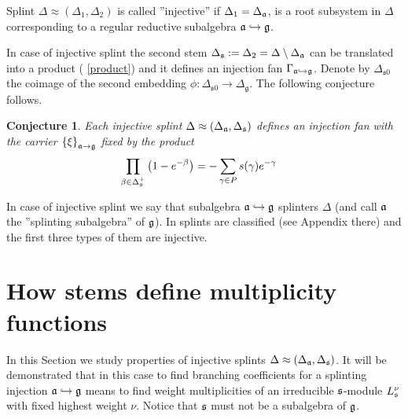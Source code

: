 \documentclass[12pt]{article}
\newtheorem{Cnj}[Def]{Conjecture}
\begin{document}
Splint $\Delta \approx (\Delta _{1},\Delta _{2})$ is called ''injective'' if
$\Delta _{1}=\Delta _{\frak{a}}$, is a root subsystem
in $\Delta $ corresponding to a regular reductive subalgebra $\frak{a}%
\hookrightarrow \frak{g}$.

In case of injective splint the second stem $\Delta _{\frak{s}}:=\Delta
_{2}=\Delta \setminus \Delta _{\frak{a}}$ can be translated into a product (%
\ref{product}) and it defines an injection fan $\Gamma _{\frak{a}%
\hookrightarrow \frak{g}}$. Denote by $\Delta_{\mathfrak{s}0}$ the coimage of the second embedding $\phi:\Delta_{\mathfrak{s}0}\to \Delta_{\mathfrak{g}}$.
The following conjecture follows.

\begin{Cnj}
Each injective splint $\Delta \approx (\Delta _{\frak{a}},\Delta _{\frak{s}})
$ defines an injection fan with the carrier $\left\{ \xi \right\} _{\frak{a}%
\rightarrow \frak{g}}$ fixed by the product
\begin{equation}
\prod_{\beta \in \Delta _{\frak{s}}^{+}}\left( 1-e^{-\beta }\right)
=-\sum_{\gamma \in P}s(\gamma )e^{-\gamma }\quad   \label{splint product}
\end{equation}
\end{Cnj}

In case of injective splint we say that subalgebra $\frak{a}\hookrightarrow \frak{g}$
splinters $\Delta $ (and call $\frak{a}$ the ''splinting subalgebra'' of $%
\frak{g}$). In \cite{richter2008splints} splints are classified (see Appendix there)
and the first three types of them are injective.

\section{How stems define multiplicity functions}

\label{sec:stems and multiplicity functions}

In this Section we study properties of injective splints  $\Delta \approx (\Delta _{\frak{a}},\Delta _{\frak{s}})
$. It will
be demonstrated that in this case to find branching
coefficients for a splinting injection $\frak{a}\hookrightarrow
\frak{g}$ means to find weight multiplicities of an irreducible
$\frak{s}$-module $L_{\frak{s}}^{\nu }$ with fixed highest weight
$\nu $. Notice that $\frak{s}$ must not be a subalgebra of
$\frak{g}$.
\end{document}
